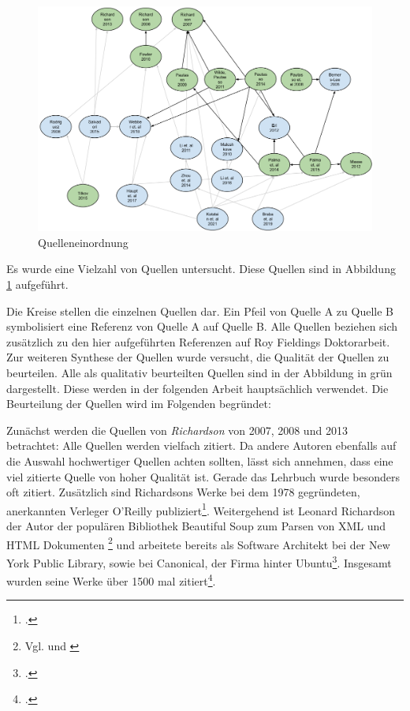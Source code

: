 \begin{figure}[htb]
\centering
\includegraphics[width=\textwidth]{graphics/quelleneinordnung.png}
\caption[quelleneinordnung]{Quelleneinordnung}
\label{abb:QuellenEinordnung}
\end{figure}


Es wurde eine Vielzahl von Quellen untersucht. Diese Quellen sind in Abbildung \ref{abb:QuellenEinordnung} aufgeführt. 

Die Kreise stellen die einzelnen Quellen dar. Ein Pfeil von Quelle A zu Quelle B symbolisiert eine Referenz von Quelle A auf Quelle B. Alle Quellen beziehen sich zusätzlich zu den hier aufgeführten Referenzen auf Roy Fieldings Doktorarbeit. Zur weiteren Synthese der Quellen wurde versucht, die Qualität der Quellen zu beurteilen. Alle als qualitativ beurteilten Quellen sind in der Abbildung in grün dargestellt. Diese werden in der folgenden Arbeit hauptsächlich verwendet. Die Beurteilung der Quellen wird im Folgenden begründet:

Zunächst werden die Quellen von \emph{Richardson} von 2007, 2008 und 2013 betrachtet: Alle Quellen werden vielfach zitiert. Da andere Autoren ebenfalls auf die Auswahl hochwertiger Quellen achten sollten, lässt sich annehmen, dass eine viel zitierte Quelle von hoher Qualität ist. Gerade das Lehrbuch \cite{richardson_restful_2007} wurde besonders oft zitiert. Zusätzlich sind Richardsons Werke bei dem 1978 gegründeten, anerkannten Verleger O’Reilly publiziert\footcite[Vgl. ][S. 1]{levy_trend_2005}. Weitergehend ist Leonard Richardson der Autor der populären  Bibliothek Beautiful Soup zum Parsen von XML und HTML Dokumenten \footnote{Vgl. \cite{richardson_beautifulsoup4_2021} und \cite{richardson_code_2021}} und arbeitete bereits als Software Architekt bei der New York Public Library, sowie bei Canonical, der Firma hinter Ubuntu\footcite[Vgl. ][]{richardson_leonard_2021}. Insgesamt wurden seine Werke über 1500 mal zitiert\footcite[Vgl. ][]{richardson_l_2021}.

